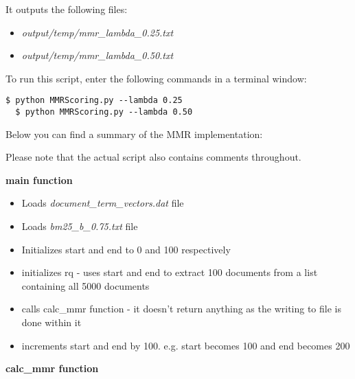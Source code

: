 \documentclass{article} %
\begin{document}
It outputs the following files:

\begin{itemize}
    \item \textit{output/temp/mmr\_lambda\_0.25.txt}
    \item \textit{output/temp/mmr\_lambda\_0.50.txt}
\end{itemize}

To run this script, enter the following commands in a terminal window:

\begin{lstlisting}[style=Bash]
  $ python MMRScoring.py --lambda 0.25
  $ python MMRScoring.py --lambda 0.50
\end{lstlisting}

Below you can find a summary of the MMR implementation:

Please note that the actual script also contains comments throughout.

\textbf{main function}

\begin{itemize}
    \item Loads \textit{document\_term\_vectors.dat} file
    \item Loads \textit{bm25\_b\_0.75.txt} file
    \item Initializes start and end to 0 and 100 respectively
    \item initializes rq - uses start and end to extract 100 documents from a list containing all 5000 documents
    \item calls calc\_mmr function - it doesn't return anything as the writing to file is done within it
    \item increments start and end by 100. e.g. start becomes 100 and end becomes 200
\end{itemize}

\textbf{calc\_mmr function}
\end{document}
